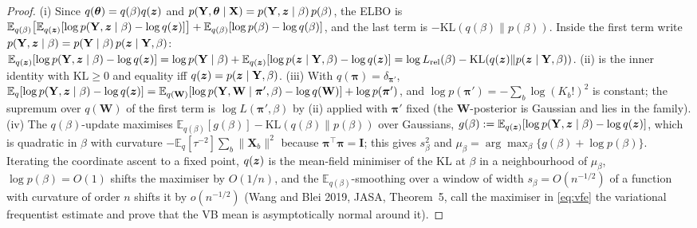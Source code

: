 \documentclass[11pt]{article}
\theoremstyle{definition}
\newcommand{\bX}{\mathbf{X}}
\newcommand{\bY}{\mathbf{Y}}
\newcommand{\bW}{\mathbf{W}}
\newcommand{\bI}{\mathbf{I}}
\newcommand{\bpi}{\boldsymbol{\pi}}
\newcommand{\btheta}{\boldsymbol{\theta}}
\newcommand{\E}{\mathbb{E}}
\newcommand{\rel}{\mathrm{rel}}
\begin{document}
\begin{proof}
(i) Since $q(\btheta)=q(\beta)q(\bz)$ and $p(\bY,\btheta\mid\bX)=p(\bY,\bz\mid\beta)\,p(\beta)$, the ELBO is $\E_{q(\beta)}\big[\E_{q(\bz)}[\log p(\bY,\bz\mid\beta)-\log q(\bz)]\big]+\E_{q(\beta)}[\log p(\beta)-\log q(\beta)]$, and the last term is $-\mathrm{KL}(q(\beta)\|p(\beta))$. Inside the first term write $p(\bY,\bz\mid\beta)=p(\bY\mid\beta)\,p(\bz\mid\bY,\beta)$: $\E_{q(\bz)}[\log p(\bY,\bz\mid\beta)-\log q(\bz)]=\log p(\bY\mid\beta)+\E_{q(\bz)}[\log p(\bz\mid\bY,\beta)-\log q(\bz)]=\log L_\rel(\beta)-\mathrm{KL}(q(\bz)\|p(\bz\mid\bY,\beta))$. (ii) is the inner identity with $\mathrm{KL}\ge0$ and equality iff $q(\bz)=p(\bz\mid\bY,\beta)$. (iii) With $q(\bpi)=\delta_{\bpi'}$, $\E_{q}[\log p(\bY,\bz\mid\beta)-\log q(\bz)]=\E_{q(\bW)}[\log p(\bY,\bW\mid\bpi',\beta)-\log q(\bW)]+\log p(\bpi')$, and $\log p(\bpi')=-\sum_b\log(K_b!)^2$ is constant; the supremum over $q(\bW)$ of the first term is $\log L(\bpi',\beta)$ by (ii) applied with $\bpi'$ fixed (the $\bW$-posterior is Gaussian and lies in the family). (iv) The $q(\beta)$-update maximises $\E_{q(\beta)}[g(\beta)]-\mathrm{KL}(q(\beta)\|p(\beta))$ over Gaussians, $g(\beta):=\E_{q(\bz)}[\log p(\bY,\bz\mid\beta)-\log q(\bz)]$, which is quadratic in $\beta$ with curvature $-\E_q[\tau^{-2}]\sum_b\|\bX_b\|^2$ because $\bpi^\top\bpi=\bI$; this gives $s_\beta^2$ and $\mu_\beta=\arg\max_\beta\{g(\beta)+\log p(\beta)\}$. Iterating the coordinate ascent to a fixed point, $q(\bm{z})$ is the mean-field minimiser of the KL at $\beta$ in a neighbourhood of $\mu_\beta$, $\log p(\beta)=O(1)$ shifts the maximiser by $O(1/n)$, and the $\E_{q(\beta)}$-smoothing over a window of width $s_\beta=O(n^{-1/2})$ of a function with curvature of order $n$ shifts it by $o(n^{-1/2})$ (Wang and Blei 2019, JASA, Theorem~5, call the maximiser in \eqref{eq:vfe} the variational frequentist estimate and prove that the VB mean is asymptotically normal around it).
\end{proof}
\end{document}

